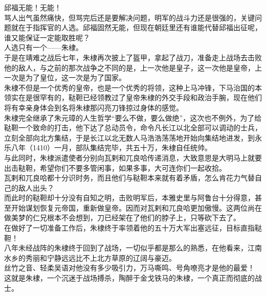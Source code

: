 \begin{multicols}{\theparacolNo}
邱福无能！无能！\\

骂人出气虽然痛快，但骂完后还是要解决问题，明军的战斗力还是很强的，关键问题就在于指挥官的人选。邱福固然无能，但现在朝廷里还有谁能代替邱福出征呢，谁又能保证一定能取胜呢？\\

人选只有一个——朱棣。\\

于是在靖难之战后七年，朱棣再次披上了盔甲，拿起了战刀，准备走上战场去击败他的敌人，与之前的那次战争之不同的是，上一次他是皇子，这一次他是皇帝，上一次是为了皇位，这一次是为了国家。\\

朱棣不但是一个优秀的皇帝，也是一个优秀的将领，这种上马冲锋，下马治国的本领实在是很罕有的，鞑靼已经领教过了皇帝朱棣的外交手段和政治手腕，现在他们将有幸亲身体会到名将朱棣那闪亮刀锋掠过身体的感觉。\\

朱棣完全继承了朱元璋的人生哲学“要么不做，要么做绝”，这次也不例外，为了给鞑靼一个致命的打击，他下达了总动员令，命令凡长江以北全部可以调动的士兵，立刻全部向北方集结，于是长江以北无数人马浩浩荡荡地开始向集结地进发，到永乐八年（1410）一月，部队集结完毕，共五十万，朱棣自任统帅。\\

与此同时，朱棣派遣使者分别向瓦剌和兀良哈传递消息，大致意思是大明马上就要出击鞑靼，希望你们不要多管闲事，如果多事，大可连你们一起收拾。\\

瓦剌和兀良哈都十分识时务，而且他们与鞑靼本来就有着矛盾，怎么肯花力气替自己的敌人出头？\\

而此时的鞑靼却十分没有自知之明，击败明军后，本雅史里与阿鲁台十分得意，甚至开始谋划恢复元帝国，重新做皇帝。因而对瓦剌和兀良哈更加傲慢。这两位尚在做美梦的仁兄根本不会想到，刀已经架在了他们的脖子上，只等砍下去了。\\

在做好了一切准备工作后，朱棣终于率领着他的五十万大军出塞远征，目标直指鞑靼！\\

八年未经战阵的朱棣终于回到了战场，一切似乎都是那么的熟悉，在他看来，江南水乡的秀丽和宁静远远比不上北方草原的辽阔与豪迈。\\

丝竹之音、轻柔吴语对他没有多少吸引力，万马嘶鸣、号角嘹亮才是他的最爱！\\

这就是朱棣，一个沉迷于战场搏杀，陶醉于金戈铁马的朱棣，一个真正而彻底的战士。\\


\end{multicols}
